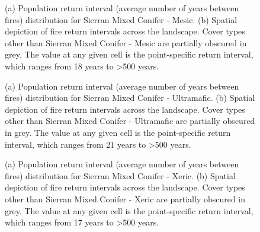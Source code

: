 \begin{figure}[!htbp]
  \centering
  \caption{(a) Population return interval (average number of years between fires) distribution for Sierran Mixed Conifer - Mesic.  (b) Spatial depiction of fire return intervals across the landscape. Cover types other than Sierran Mixed Conifer - Mesic are partially obscured in grey. The value at any given cell is the point-specific return interval, which ranges from 18 years to \textgreater 500 years.}
\label{fig:preturn_smcm}
\end{figure}

\begin{figure}[!htbp]
  \centering
  \caption{(a) Population return interval (average number of years between fires) distribution for Sierran Mixed Conifer - Ultramafic.  (b) Spatial depiction of fire return intervals across the landscape. Cover types other than Sierran Mixed Conifer - Ultramafic are partially obscured in grey. The value at any given cell is the point-specific return interval, which ranges from 21 years to \textgreater 500 years.}
\label{fig:preturn_smcu}
\end{figure}

\begin{figure}[!htbp]
  \centering
  \caption{(a) Population return interval (average number of years between fires) distribution for Sierran Mixed Conifer - Xeric.  (b) Spatial depiction of fire return intervals across the landscape. Cover types other than Sierran Mixed Conifer - Xeric are partially obscured in grey. The value at any given cell is the point-specific return interval, which ranges from 17 years to \textgreater 500 years.}
\label{fig:preturn_smcx}
\end{figure}

\clearpage

